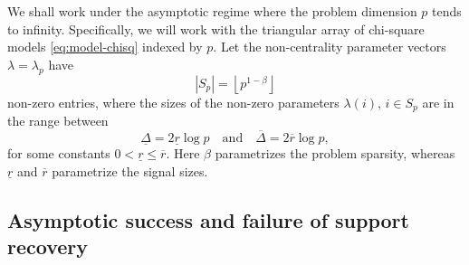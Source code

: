 
We shall work under the asymptotic regime where the problem dimension $p$ tends to infinity.
Specifically, we will work with the triangular array of chi-square models \eqref{eq:model-chisq} indexed by $p$.
Let the non-centrality parameter vectors $\lambda = \lambda_p$ have 
\begin{equation} \label{eq:signal-sparsity}
    |S_p| = \left\lfloor p^{1-\beta} \right\rfloor
\end{equation}
non-zero entries, where the sizes of the non-zero parameters $\lambda(i),\,i\in S_p$ are in the range between
\begin{equation} \label{eq:signal-size}
    \underline{\Delta} = 2\underline{r}\log{p}
    \quad\text{and}\quad
    \overline{\Delta} = 2\overline{r}\log{p},
\end{equation}
for some constants $0<\underline{r}\le\overline{r}$.
Here $\beta$ parametrizes the problem sparsity, whereas $\underline{r}$ and $\overline{r}$ parametrize the signal sizes.

\subsection{Asymptotic success and failure of support recovery}


